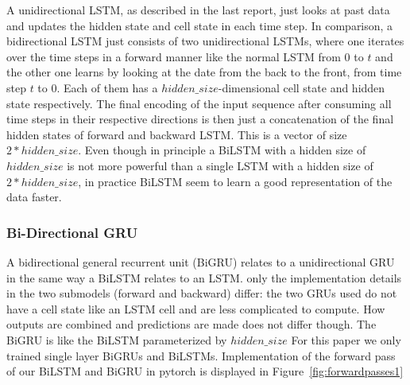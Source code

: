\documentclass[utf8x]{ctexart}
\begin{document}
A unidirectional LSTM, as described in the last report, just looks at past data and updates the hidden state and cell state in each time step. In comparison, a bidirectional LSTM just consists of two unidirectional LSTMs, where one iterates over the time steps in a forward manner like the normal LSTM from 0 to $t$ and the other one learns by looking at the date from the back to the front, from time step $t$ to 0.
Each of them has a $hidden\_size$-dimensional cell state and hidden state respectively. The final encoding of the input sequence after consuming all time steps in their respective directions is then just a concatenation of the final hidden states of forward and backward LSTM. This is a vector of size  $2*hidden\_size$. Even though in principle a BiLSTM with a hidden size of $hidden\_size$ is not more powerful than a single LSTM with a hidden size of $2*hidden\_size$, in practice BiLSTM seem to learn a good representation of the data faster.

\subsubsection{Bi-Directional GRU}

A bidirectional general recurrent unit (BiGRU) relates to a unidirectional GRU in the same way a BiLSTM relates to an LSTM. only the implementation details in the two submodels (forward and backward) differ: the two GRUs used do not have a cell state like an LSTM cell and are less complicated to compute. How outputs are combined and predictions are made does not differ though. The BiGRU is like the BiLSTM parameterized by $hidden\_size$
For this paper we only trained single layer BiGRUs and BiLSTMs.
Implementation of the forward pass of our BiLSTM  and BiGRU in pytorch is displayed in Figure~\ref{fig:forwardpasses1}
\end{document}
